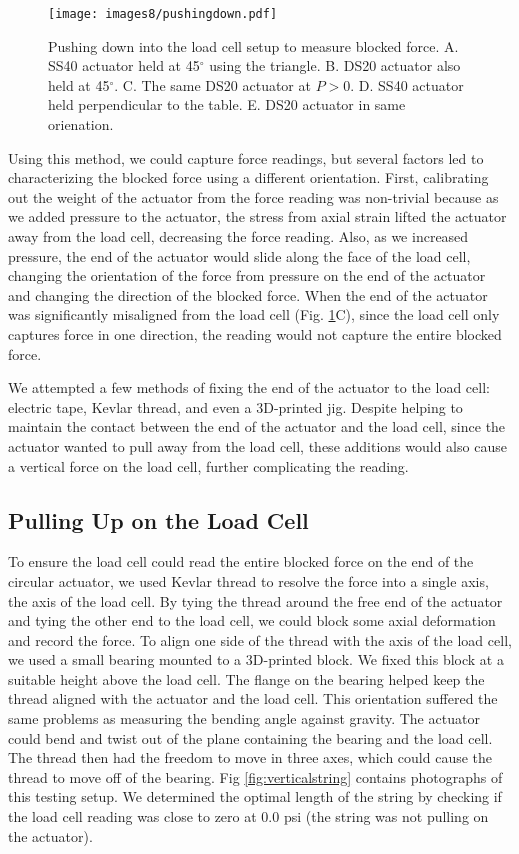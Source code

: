 \begin{figure}[!ht]
    \centering
     \texttt{[image: images8/pushingdown.pdf]}
    \caption{Pushing down into the load cell setup to measure blocked force. A. SS40 actuator held at 45$^\circ$ using the triangle. B. DS20 actuator also held at 45$^\circ$. C. The same DS20 actuator at $P>0$. D. SS40 actuator held perpendicular to the table. E. DS20 actuator in same orienation.}
    \label{fig:pushingdown}
\end{figure}

Using this method, we could capture force readings, but several factors led to characterizing the blocked force using a different orientation. First, calibrating out the weight of the actuator from the force reading was non-trivial because as we added pressure to the actuator, the stress from axial strain lifted the actuator away from the load cell, decreasing the force reading. Also, as we increased pressure, the end of the actuator would slide along the face of the load cell, changing the orientation of the force from pressure on the end of the actuator and changing the direction of the blocked force. When the end of the actuator was significantly misaligned from the load cell (Fig. \ref{fig:pushingdown}C), since the load cell only captures force in one direction, the reading would not capture the entire blocked force. 

We attempted a few methods of fixing the end of the actuator to the load cell: electric tape, Kevlar thread, and even a 3D-printed jig. Despite helping to maintain the contact between the end of the actuator and the load cell, since the actuator wanted to pull away from the load cell, these additions would also cause a vertical force on the load cell, further complicating the reading. 

\clearpage
\subsection{Pulling Up on the Load Cell}

To ensure the load cell could read the entire blocked force on the end of the circular actuator, we used Kevlar thread to resolve the force into a single axis, the axis of the load cell. By tying the thread around the free end of the actuator and tying the other end to the load cell, we could block some axial deformation and record the force. To align one side of the thread with the axis of the load cell, we used a small bearing mounted to a 3D-printed block. We fixed this block at a suitable height above the load cell. The flange on the bearing helped keep the thread aligned with the actuator and the load cell. This orientation suffered the same problems as measuring the bending angle against gravity. The actuator could bend and twist out of the plane containing the bearing and the load cell. The thread then had the freedom to move in three axes, which could cause the thread to move off of the bearing. Fig \ref{fig:verticalstring} contains photographs of this testing setup. We determined the optimal length of the string by checking if the load cell reading was close to zero at 0.0 psi (the string was not pulling on the actuator). 

